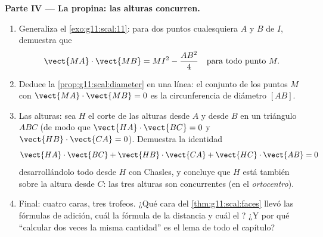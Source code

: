 \begin{problem}
\medskip
\noindent\textbf{Parte IV --- La propina: las alturas concurren.}
\begin{enumerate}[resume]
  \item Generaliza el \cref{exo:g11:scal:11}: para dos puntos cualesquiera
        $A$ y $B$ de  $I$, demuestra que
        \[
        \vect{MA} \cdot \vect{MB} = MI^2 - \frac{AB^2}{4}
        \quad\text{para todo punto } M .
        \]
  \item Deduce la \cref{prop:g11:scal:diameter} en una línea: el conjunto
        de los puntos $M$ con $\vect{MA} \cdot \vect{MB} = 0$ es la
        circunferencia de diámetro $[AB]$.
  \item Las alturas: sea $H$ el corte de las alturas desde $A$ y desde $B$
        en un triángulo $ABC$ (de modo que $\vect{HA} \cdot \vect{BC} = 0$
        y $\vect{HB} \cdot \vect{CA} = 0$). Demuestra la identidad
        \[
        \vect{HA} \cdot \vect{BC} + \vect{HB} \cdot \vect{CA}
        + \vect{HC} \cdot \vect{AB} = 0
        \]
        desarrollándolo todo desde $H$ con Chasles, y concluye que $H$
        está también sobre la altura desde $C$: las tres alturas son
        concurrentes (en el \emph{ortocentro}).
  \item Final: cuatro caras, tres trofeos. ¿Qué cara del
        \cref{thm:g11:scal:faces} llevó las fórmulas de adición, cuál la
        fórmula de la distancia y cuál el ? ¿Y por qué
        ``calcular dos veces la misma cantidad'' es el lema de todo el
        capítulo?
\end{enumerate}
\end{problem}
